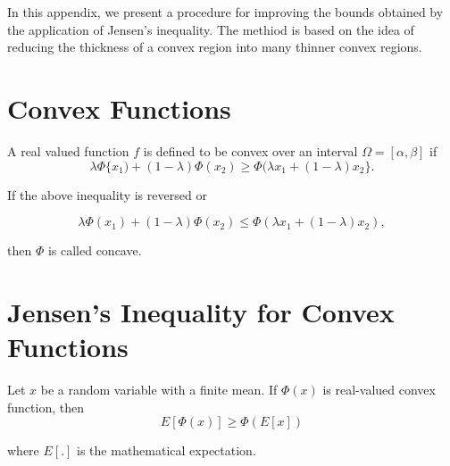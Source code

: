 In this appendix, we present a procedure for improving the bounds
obtained by the application of Jensen's inequality. The methiod is
based on the idea of reducing the thickness of a convex region
into many thinner convex regions.
\section{Convex Functions}
A real valued function $f$ is defined to be convex over an
interval $\Omega=[\alpha, \beta]$ if
\begin{equation}
\lambda \Phi\{x_1)+(1-\lambda)\Phi(x_2) \ge \Phi (\lambda x_1
+(1-\lambda ) x_2\}.
\end{equation}

If the above inequality is reversed or

\begin{equation}
\lambda \Phi(x_1)+(1-\lambda)\Phi(x_2) \le \Phi (\lambda x_1
+(1-\lambda ) x_2),
\end{equation}

then $\Phi$ is called concave.

\section{Jensen's Inequality for Convex Functions}
Let $x$ be a random variable with a finite mean. If $\Phi(x)$ is
real-valued convex function, then
\begin{equation}
E[\Phi(x)] \ge \Phi \left( E[x] \right)
\end{equation}

\noindent where $E[.]$ is the mathematical expectation.
